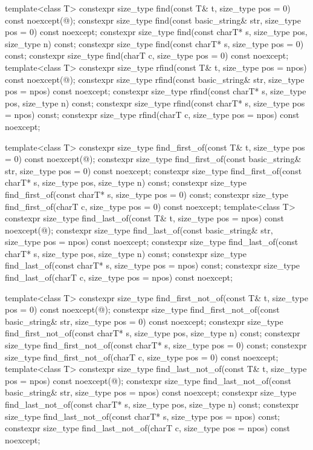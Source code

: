 \begin{codeblock}
{{    template<class T>
      constexpr size_type find(const T& t, size_type pos = 0) const noexcept(@\seebelow@);
    constexpr size_type find(const basic_string& str, size_type pos = 0) const noexcept;
    constexpr size_type find(const charT* s, size_type pos, size_type n) const;
    constexpr size_type find(const charT* s, size_type pos = 0) const;
    constexpr size_type find(charT c, size_type pos = 0) const noexcept;
    template<class T>
      constexpr size_type rfind(const T& t, size_type pos = npos) const noexcept(@\seebelow@);
    constexpr size_type rfind(const basic_string& str, size_type pos = npos) const noexcept;
    constexpr size_type rfind(const charT* s, size_type pos, size_type n) const;
    constexpr size_type rfind(const charT* s, size_type pos = npos) const;
    constexpr size_type rfind(charT c, size_type pos = npos) const noexcept;

    template<class T>
      constexpr size_type find_first_of(const T& t, size_type pos = 0) const noexcept(@\seebelow@);
    constexpr size_type find_first_of(const basic_string& str, size_type pos = 0) const noexcept;
    constexpr size_type find_first_of(const charT* s, size_type pos, size_type n) const;
    constexpr size_type find_first_of(const charT* s, size_type pos = 0) const;
    constexpr size_type find_first_of(charT c, size_type pos = 0) const noexcept;
    template<class T>
      constexpr size_type find_last_of(const T& t,
                                       size_type pos = npos) const noexcept(@\seebelow@);
    constexpr size_type find_last_of(const basic_string& str,
                                     size_type pos = npos) const noexcept;
    constexpr size_type find_last_of(const charT* s, size_type pos, size_type n) const;
    constexpr size_type find_last_of(const charT* s, size_type pos = npos) const;
    constexpr size_type find_last_of(charT c, size_type pos = npos) const noexcept;

    template<class T>
      constexpr size_type find_first_not_of(const T& t,
                                            size_type pos = 0) const noexcept(@\seebelow@);
    constexpr size_type find_first_not_of(const basic_string& str,
                                          size_type pos = 0) const noexcept;
    constexpr size_type find_first_not_of(const charT* s, size_type pos, size_type n) const;
    constexpr size_type find_first_not_of(const charT* s, size_type pos = 0) const;
    constexpr size_type find_first_not_of(charT c, size_type pos = 0) const noexcept;
    template<class T>
      constexpr size_type find_last_not_of(const T& t,
                                           size_type pos = npos) const noexcept(@\seebelow@);
    constexpr size_type find_last_not_of(const basic_string& str,
                                         size_type pos = npos) const noexcept;
    constexpr size_type find_last_not_of(const charT* s, size_type pos, size_type n) const;
    constexpr size_type find_last_not_of(const charT* s, size_type pos = npos) const;
    constexpr size_type find_last_not_of(charT c, size_type pos = npos) const noexcept;

}}
\end{codeblock}
